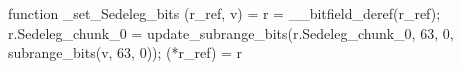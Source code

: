 function _set_Sedeleg_bits (r_ref, v) = {
    r = __bitfield_deref(r_ref);
    r.Sedeleg_chunk_0 = update_subrange_bits(r.Sedeleg_chunk_0, 63, 0, subrange_bits(v, 63, 0));
    (*r_ref) = r
}
